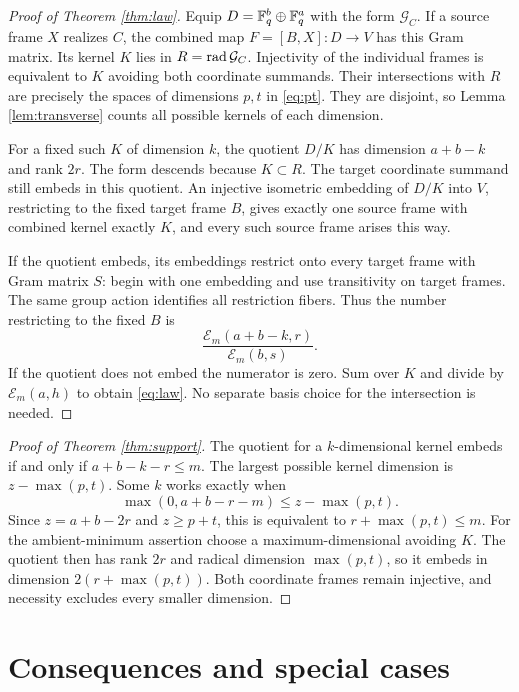 \begin{proof}[Proof of Theorem \ref{thm:law}]
Equip $D=\mathbb F_q^b\oplus\mathbb F_q^a$ with the form $\mathcal G_C$.
If a source frame $X$ realizes $C$, the combined map
$F=[B,X]:D\to V$ has this Gram matrix. Its kernel $K$ lies in
$R=\operatorname{rad}\mathcal G_C$. Injectivity of the individual frames is
equivalent to $K$ avoiding both coordinate summands.
Their intersections with $R$ are precisely the spaces of dimensions
$p,t$ in \eqref{eq:pt}. They are disjoint, so Lemma
\ref{lem:transverse} counts all possible kernels of each dimension.

For a fixed such $K$ of dimension $k$, the quotient $D/K$ has
dimension $a+b-k$ and rank $2r$. The form descends because $K\subset R$.
The target coordinate summand still embeds in this quotient.
An injective isometric embedding of $D/K$ into $V$, restricting to the
fixed target frame $B$, gives exactly one source frame with combined
kernel exactly $K$, and every such source frame arises this way.

If the quotient embeds, its embeddings restrict onto every target
frame with Gram matrix $S$: begin with one embedding and use
transitivity on target frames. The same group action identifies all
restriction fibers. Thus the number restricting to the fixed $B$ is
\[
 \frac{\mathcal E_m(a+b-k,r)}{\mathcal E_m(b,s)}.
\]
If the quotient does not embed the numerator is zero.
Sum over $K$ and divide by $\mathcal E_m(a,h)$ to obtain
\eqref{eq:law}. No separate basis choice for the intersection is needed.
\end{proof}

\begin{proof}[Proof of Theorem \ref{thm:support}]
The quotient for a $k$-dimensional kernel embeds if and only if
$a+b-k-r\le m$. The largest possible kernel dimension is
$z-\max(p,t)$. Some $k$ works exactly when
\[
 \max(0,a+b-r-m)\le z-\max(p,t).
\]
Since $z=a+b-2r$ and $z\ge p+t$, this is equivalent to
$r+\max(p,t)\le m$.
For the ambient-minimum assertion choose a maximum-dimensional
avoiding $K$. The quotient then has rank $2r$ and radical dimension
$\max(p,t)$, so it embeds in dimension $2(r+\max(p,t))$.
Both coordinate frames remain injective, and necessity excludes
every smaller dimension.
\end{proof}

\section{Consequences and special cases}\label{sec:consequences}

